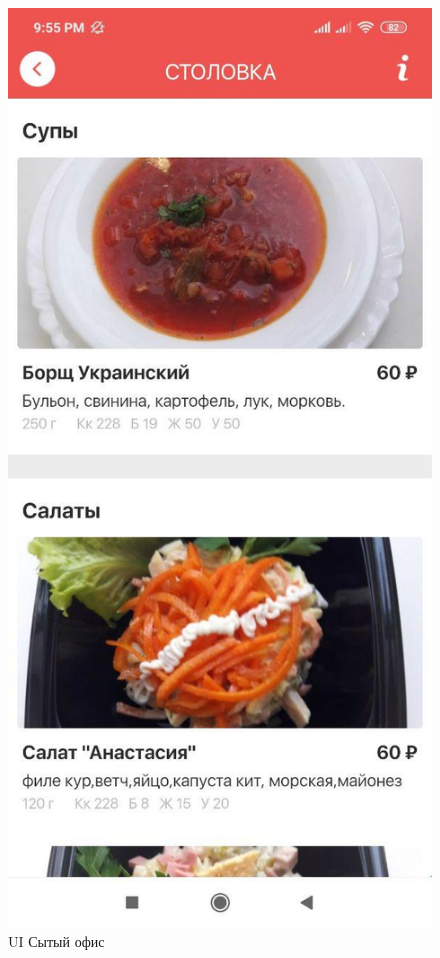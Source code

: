 \documentclass[14pt]{matmex-diploma-custom}
\begin{document}
    \begin{figure}
    \centering
    \includegraphics[scale=0.40]{fig1.jpg}
    \caption{UI Сытый офис}
    \end{figure}
\end{document}
